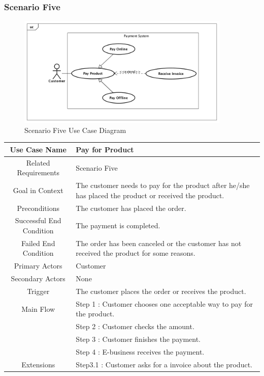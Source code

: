 \documentclass[12pt]{scrreprt}
\begin{document}
\subsubsection{Scenario Five}
\begin{figure}[H]
  \centering\includegraphics[width=4in]{DocumentRes/5UseCaseDiagram.png}
  \caption{Scenario Five Use Case Diagram}
\end{figure}

\begin{table}[H]
  \centering
  \begin{tabular}{| c | p{11cm} |}
    \hline
    Use Case Name & Pay for Product\\
    \hline
    Related Requirements & Scenario Five\\
    \hline
    Goal in Context & The customer needs to pay for the product after he/she
    has placed the product or received the product.\\
    \hline
    Preconditions & The customer has placed the order.\\
    \hline
    Successful End Condition & The payment is completed.\\
    \hline
    Failed End Condition & The order has been canceled or the customer has not
    received the product for some reasons.\\
    \hline
    Primary Actors & Customer\\
    \hline
    Secondary Actors & None\\
    \hline
    Trigger & The customer places the order or receives the product.\\
    \hline
    Main Flow & Step 1 : Customer chooses one acceptable way to pay for the
    product.\\
    & Step 2 : Customer checks the amount.\\
    & Step 3 : Customer finishes the payment.\\
    & Step 4 : E-business receives the payment.\\
    \hline
    Extensions & Step3.1 : Customer asks for a invoice about the product.\\
    \hline
  \end{tabular}
\end{table}
\end{document}
